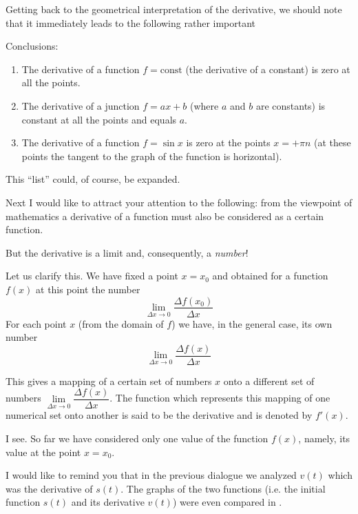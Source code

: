 Getting back to the geometrical interpretation of the derivative, we should note that it immediately leads to the following rather important

\begin{mytheo}{Conclusions:}
\begin{enumerate}[label=\textsection]
\item The derivative of a function $f = \text{const}$ (the derivative of a constant) is zero at all the points.
\item The derivative of a junction $f = ax + b$ (where $a$ and $b$ are constants) is constant at all the points and equals $a$.
\item The derivative of a function $f = \sin x$ is zero at the points $x = + \pi n$ (at these points the tangent to the graph of the function is horizontal).
\end{enumerate}
\end{mytheo}

This ``list'' could, of course, be expanded.

Next I would like to attract your attention to the following: from the viewpoint of mathematics a derivative of a function must also be considered as a certain function.

\rdr But the derivative is a limit and, consequently, a \emph{number}!

\athr Let us clarify this. We have fixed a point $x = x_{0}$ and obtained for a function $f (x)$ at this point the number
\begin{equation*}%
\lim\limits_{\Delta x \to 0} \frac{\Delta f (x_{0})}{\Delta x}
\end{equation*}
For each point $x$ (from the domain of $f$) we have, in the general case, its own number
\begin{equation*}%
\lim\limits_{\Delta x \to 0} \frac{\Delta f (x)}{\Delta x}
\end{equation*}
\begin{mytheo}{}
This gives a mapping of a certain set of numbers $x$ onto a different set of numbers $\lim\limits_{\Delta x \to 0} \dfrac{\Delta f (x)}{\Delta x}$. The function which represents this mapping of one numerical set onto another is said to be the derivative and is denoted by $f'(x)$.
\end{mytheo}

\rdr I see. So far we have considered only one value of the function $f (x)$, namely, its value at the point $x = x_{0}$.

\athr I would like to remind you that in the previous dialogue we analyzed $v (t) $ which was the derivative of $s (t)$. The graphs of the two functions (i.e. the initial function $s (t)$ and its derivative $v (t)$) were even compared in .

